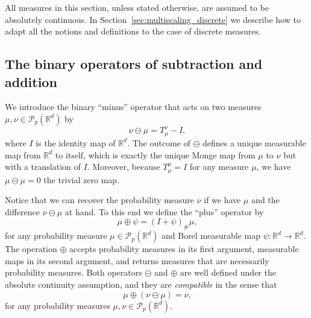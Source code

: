 \documentclass[12pt]{amsart}
\begin{document}
All measures in this section, unless stated otherwise, are assumed to be absolutely continuous. In Section~\ref{sec:multiscaling_discrete} we describe how to adapt all the notions and definitions to the case of discrete measures.

\subsection{The binary operators of subtraction and addition}

We introduce the binary ``minus'' operator that acts on two measures $\mu,\nu\in\mathcal{P}_p(\mathbb{R}^d)$ by
\begin{equation}~\label{eqn:ominus}
    \nu \ominus \mu = T_\mu^\nu - I,
\end{equation}
where $I$ is the identity map of $\mathbb{R}^d$. The outcome of $\ominus$ defines a unique measurable map from $\mathbb{R}^d$ to itself, which is exactly the unique Monge map from $\mu$ to $\nu$ but with a translation of $I$. Moreover, because $T_\mu^\mu=I$ for any measure $\mu$, we have $\mu\ominus\mu=0$ the trivial zero map.

Notice that we can recover the probability measure $\nu$ if we have $\mu$ and the difference $\nu\ominus\mu$ at hand. To this end we define the ``plus'' operator by
\begin{equation}~\label{eqn:oplus}
    \mu \oplus \psi = (I + \psi)_\#\mu,
\end{equation}
for any probability measure $\mu\in\mathcal{P}_p(\mathbb{R}^d)$ and Borel measurable map $\psi:\mathbb{R}^d\to\mathbb{R}^d$. The operation $\oplus$ accepts probability measures in its first argument, measurable maps in its second argument, and returns measures that are necessarily probability measures. Both operators $\ominus$ and $\oplus$ are well defined under the absolute continuity assumption, and they are \emph{compatible} in the sense that
\begin{equation}~\label{eqn:operators_compatibility}
    \mu \oplus (\nu \ominus \mu) = \nu,
\end{equation}
for any probability measures $\mu,\nu\in\mathcal{P}_p(\mathbb{R}^d)$.
\end{document}
